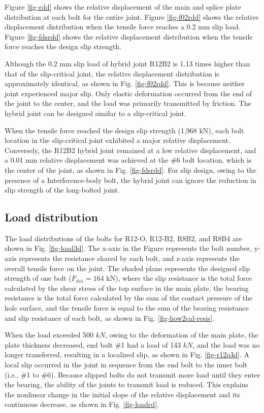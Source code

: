 Figure \ref{fig-rdd} shows the relative displacement of the main and splice plate distribution at each bolt for the entire joint. Figure \ref{fig-f02rdd} shows the relative displacement distribution when the tensile force reaches a 0.2 mm slip load. Figure \ref{fig-fdsrdd} shows the relative displacement distribution when the tensile force reaches the design slip strength.

Although the 0.2 mm slip load of hybrid joint R12B2 is 1.13 times higher than that of the slip-critical joint, the relative displacement distribution is approximately identical, as shown in Fig. \ref{fig-f02rdd}. This is because neither joint experienced major slip. Only elastic deformation occurred from the end of the joint to the center, and the load was primarily transmitted by friction. The hybrid joint can be designed similar to a slip-critical joint.

When the tensile force reached the design slip strength (1,968 kN), each bolt location in the slip-critical joint exhibited a major relative displacement. Conversely, the R12B2 hybrid joint remained at a low relative displacement, and a 0.01 mm relative displacement was achieved  at the \#6 bolt location, which is the center of the joint, as shown in Fig. \ref{fig-fdsrdd}. For slip design, owing to the presence of a Interference-body bolt, the hybrid joint can ignore the reduction in slip strength of the long-bolted joint.

\subsection{Load distribution}

The load distributions of the bolts for R12-O, R12-B2, R8B2, and R8B4 are shown in Fig. \ref{fig-load3d}. The x-axis in the Figure represents the bolt number, y-axis represents the resistance shared by each bolt, and z-axis represents the overall tensile force on the joint. The shaded plane represents the designed slip strength of one bolt ($F_{ds1}=164 $ kN), where the slip resistance is the total force calculated by the shear stress of the top surface in the main plate, the bearing resistance is the total force calculated by the sum of the contact pressure of the hole surface, and the tensile force is equal to the sum of the bearing resistance and slip resistance of each bolt, as shown in Fig. \ref{fig-how2cal-resis}. 

When the load exceeded 500 $kN$, owing to the deformation of the main plate, the plate thickness decreased, end bolt \#1 had a load of 143 $kN$, and the load was no longer transferred, resulting in a localized slip, as shown in Fig. \ref{fig-r12o3d}. A local slip occurred in the joint in sequence from the end bolt to the inner bolt (i.e., \#1 to \#6). Because slipped bolts do not transmit more load until they enter the bearing, the ability of the joints to transmit load is reduced. This explains the nonlinear change in the initial slope of the relative displacement and its continuous decrease, as shown in Fig. \ref{fig-loadrd}.

